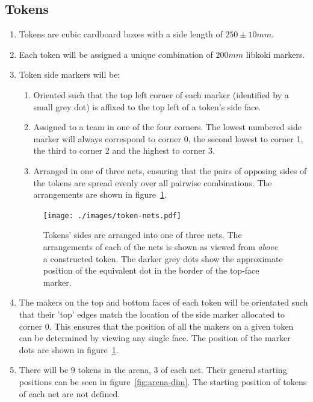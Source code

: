 \subsection{Tokens}
\label{sub:Tokens}
\begin{enumerate}
\item Tokens are cubic cardboard boxes with a side length of $250 \pm 10 mm$.

\item Each token will be assigned a unique combination of $200mm$ libkoki markers.

\item Token side markers will be:
    \begin{enumerate}
    \item Oriented such that the top left corner of each marker (identified by a small grey dot) is affixed to the top left of a token's side face.

    \item Assigned to a team in one of the four corners.
          The lowest numbered side marker will always correspond to corner 0, the second lowest to corner 1, the third to corner 2 and the highest to corner 3.

    \item Arranged in one of three nets, ensuring that the pairs of opposing sides of the tokens are spread evenly over all pairwise combinations.
          The arrangements are shown in figure~\ref{fig:token-nets}.
    \end{enumerate}

\begin{figure}
  \centering
  \texttt{[image: ./images/token-nets.pdf]}
  \caption{Tokens' sides are arranged into one of three nets.
           The arrangements of each of the nets is shown as viewed from \textit{above} a constructed token.
           The darker grey dots show the approximate position of the equivalent dot in the border of the top-face marker.}
  \label{fig:token-nets}
\end{figure}

\item The makers on the top and bottom faces of each token will be orientated such that their 'top' edges match the location of the side marker allocated to corner 0.
      This ensures that the position of all the makers on a given token can be determined by viewing any single face.
      The position of the marker dots are shown in figure~\ref{fig:token-nets}.

\item There will be 9 tokens in the arena, 3 of each net.
      Their general starting positions can be seen in figure~\ref{fig:arena-dim}.
      The starting position of tokens of each net are not defined.


\end{enumerate}

